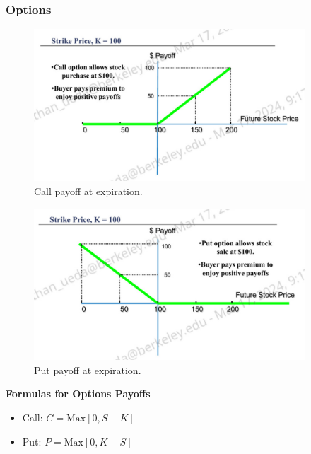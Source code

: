 \documentclass[11pt]{article}
\begin{document}
\subsubsection{Options}

\begin{figure}[H] 
    \centering 
    \includegraphics[width=4in]{imgs/call_payoff.png}
    \caption{Call payoff at expiration.}
\end{figure}

\begin{figure}[H] 
    \centering 
    \includegraphics[width=4in]{imgs/put_payoff.png}
    \caption{Put payoff at expiration.}
\end{figure}

\textbf{Formulas for Options Payoffs}
\begin{itemize}
    \item Call: $C = \text{Max}[0, S-K]$
    \item Put: $P = \text{Max}[0, K-S]$
\end{itemize}
\end{document}
